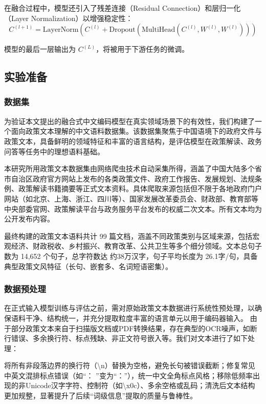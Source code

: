 \documentclass[12pt, a4paper]{ctexart}
\begin{document}
在融合过程中，模型还引入了残差连接（Residual Connection）和层归一化（Layer Normalization）以增强稳定性：
\begin{equation}
    C^{(l+1)} = \text{LayerNorm}(C^{(l)} + \text{Dropout}(\text{MultiHead}(C^{(l)}, W^{(l)}, W^{(l)})))
\end{equation}

模型的最后一层输出为 $C^{(L)}$，将被用于下游任务的微调。

\subsection{实验准备}
\subsubsection{数据集}
为验证本文提出的融合式中文编码模型在真实领域场景下的有效性，我们构建了一个面向政策文本理解的中文语料数据集。该数据集聚焦于中国语境下的政府文件与政策文本，具备鲜明的领域特征和丰富的语言结构，是评估模型在政策解读、政务问答等任务中的理想语料基础。

本研究所用政策文本数据集由网络爬虫技术自动采集所得，涵盖了中国大陆多个省市自治区政府官方网站上发布的各类政策文件、政府工作报告、发展规划、法规条例、政策解读书籍摘要等正式文本资料。具体爬取来源包括但不限于各地政府门户网站（如北京、上海、浙江、四川等）、国家发展改革委员会、财政部、教育部等中央部委官网、政策解读平台与政务服务平台发布的权威二次文本。所有文本均为公开发布内容。

最终构建的政策文本语料共计 99 篇文档，涵盖不同政策类别与区域来源，包括宏观经济、财政税收、乡村振兴、教育改革、公共卫生等多个细分领域。文本总句子数为 14,652 个句子，总字符数达 约38万汉字，句子平均长度为 26.1字/句，具备典型政策文风特征（长句、嵌套多、名词短语密集）。

\subsubsection{数据预处理}
在正式输入模型训练与评估之前，需对原始政策文本数据进行系统性预处理，以确保语料干净、结构统一，并充分提取粒度丰富的语言单元以用于编码器输入。
由于部分政策文本来自于扫描版文档或PDF转换结果，存在典型的OCR噪声，如断行错误、多余换行符、标点残缺、非正文符号嵌入等。我们对文本进行了如下处理：

将所有非段落边界的换行符（\textbackslash n）替换为空格，避免长句被错误截断；修复常见中英文混排标点错误（如“： ”变为“：”），统一中文全角标点风格；移除低频率出现的非Unicode汉字字符、控制符（如\textbackslash x0c）、多余空格或乱码；清洗后文本结构更加规整，显著提升了后续“词级信息”提取的质量与鲁棒性。
\end{document}
